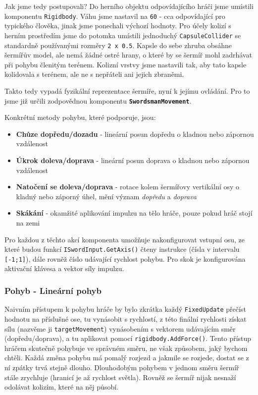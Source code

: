 Jak jsme tedy postupovali? Do herního objektu odpovídajícího hráči jsme umístili komponentu \texttt{Rigidbody}. Váhu jsme nastavil na \texttt{60} - cca odpovídající pro typického člověka, jinak jsme ponechali výchozí hodnoty. Pro účely kolizí s herním prostředím jsme do potomka umístili jednoduchý \texttt{CapsuleCollider} se standardně používanými rozměry \texttt{2 x 0.5}. Kapsle do sebe zhruba obsáhne šermířův model, ale nemá žádné ostré hrany, o které by se šermíř mohl zadrhávat při pohybu členitým terénem. Kolizní vrstvy jsme nastavili tak, aby tato kapsle kolidovala s terénem, ale ne s nepřáteli ani jejich zbraněmi.

Takto tedy vypadá fyzikální reprezentace šermíře, nyní k jejímu ovládání. Pro to jsme již určili zodpovědnou komponentu \textbf{\texttt{SwordsmanMovement}}. 

Konkrétní metody pohybu, které podporuje, jsou:
\begin{itemize}
  \item \textbf{Chůze dopředu/dozadu} - lineární posun dopředu o kladnou nebo zápornou vzdálenost
  \item \textbf{Úkrok doleva/doprava} - lineární posun doprava o kladnou nebo zápornou vzdálenost
  \item \textbf{Natočení se doleva/doprava} - rotace kolem šermířovy vertikální osy o kladný nebo záporný úhel, mění význam \textit{dopředu} a \textit{doprava}
  \item \textbf{Skákání} - okamžité aplikování impulzu na tělo hráče, pouze pokud hráč stojí na zemi
\end{itemize}

Pro každou z těchto akcí komponenta umožňuje nakonfigurovat vstupní osu, ze které budou funkcí \texttt{ISwordInput.GetAxis()} čteny instrukce (čísla v intervalu \texttt{[-1;1]}), dále rovněž číslo udávající rychlost pohybu. Pro skok je konfigurována aktivační klávesa a vektor síly impulzu.

\subsubsection*{Pohyb - Lineární pohyb}

Naivním přístupem k pohybu hráče by bylo zkrátka každý \texttt{FixedUpdate} přečíst hodnotu na příslušné ose, tu vynásobit s rychlostí, z této finální rychlosti získat sílu (nazvěme ji \texttt{targetMovement}) vynásobením s vektorem udávajícím směr (dopředu/doprava), a tu aplikovat pomocí \texttt{rigidbody.AddForce()}.
Tento přístup hráčem skutečně pohybuje ve správném směru, ne však způsobem, jaký bychom chtěli. Každá změna pohybu má pomalý rozjezd a jakmile se rozjede, dostat se z ní zpátky trvá stejně dlouho. Dlouhodobým pohybem v jednom směru šermíř stále zrychluje (hranicí je až rychlost světla). Rovněž se šermíř nijak nesnaží odolávat kolizím, které na něj působí. 

